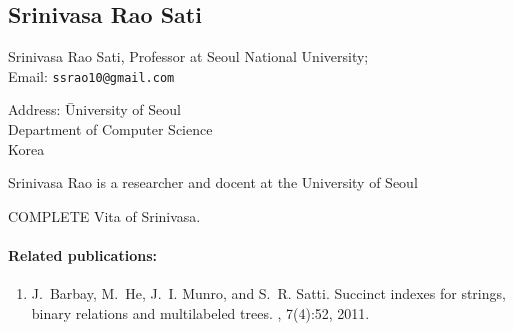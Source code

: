\documentclass[a4paper,10pt]{article}
\begin{document}
\subsection*{Srinivasa Rao Sati}

\begin{multicols}{2}
\noindent Srinivasa Rao Sati, Professor at Seoul National  University; \\
Email: \texttt{ssrao10@gmail.com} \\
\begin{tabbing}
Address: \=  University of Seoul\\
\> Department of Computer Science\\
\> Korea
\end{tabbing}
\end{multicols}

Srinivasa Rao  is a researcher and docent at the University of Seoul
\begin{TODO}
COMPLETE Vita of Srinivasa.
\end{TODO}

\paragraph{Related publications:}
\begin{enumerate}
\item
J.~Barbay, M.~He, J.~I. Munro, and S.~R. Satti.
\newblock Succinct indexes for strings, binary relations and multilabeled
  trees.
 , 7(4):52, 2011.
\end{enumerate}


\newpage



\end{document}
